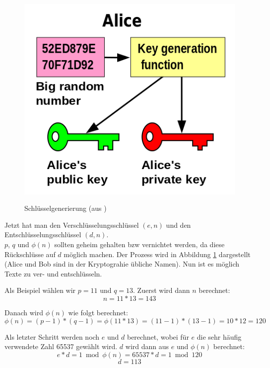 \documentclass[12pt,a4paper]{scrartcl}
\begin{document}
\begin{figure}[h]
\centering
\includegraphics[scale=0.5]{Orange_blue_public_private_keygeneration} \\
\caption{Schlüsselgenerierung (aus \cite{wikipedia_keygen})}
\label{fig:figure1}
\end{figure}

Jetzt hat man den Verschlüsselungsschlüssel $(e, n)$ und den Entschlüsselungsschlüssel $(d, n)$. \\
$p$, $q$ und $\phi(n)$ sollten geheim gehalten bzw vernichtet werden, da diese Rückschlüsse auf $d$ möglich machen. Der Prozess wird in Abbildung \ref{fig:figure1} dargestellt (Alice und Bob sind in der Kryptograhie übliche Namen). Nun ist es möglich Texte zu ver- und entschlüsseln. 

Als Beispiel wählen wir $p=11$ und $q=13$.
Zuerst wird dann $n$ berechnet:
$$n = 11*13 = 143$$

Danach wird $\phi (n)$ wie folgt berechnet:
$$\phi(n) = (p-1)*(q-1) = \phi(11*13) = (11 - 1) * (13-1) = 10 * 12 = 120$$

Als letzter Schritt werden noch $e$ und $d$ berechnet, wobei für $e$ die sehr häufig verwendete Zahl 65537 gewählt wird. \cite[S.2735]{eNumber}  $d$ wird dann aus $e$ und $\phi(n)$ berechnet:
$$e * d = 1 \bmod \phi(n) = 65537 * d = 1 \bmod 120$$
$$ d = 113$$
\end{document}
